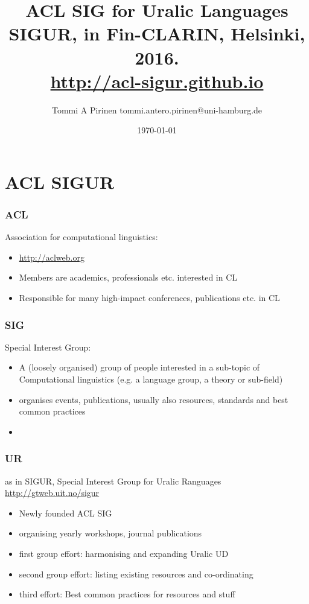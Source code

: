 \documentclass{beamer}
\title{ACL SIG for Uralic Languages SIGUR,
\scriptsize{in Fin-CLARIN, Helsinki, 2016.\\
\url{http://acl-sigur.github.io}}}
\author{Tommi A Pirinen \scriptsize \guilsinglleft
tommi.antero.pirinen@uni-hamburg.de \guilsinglright }
\institute{Universität Hamburg}
\date{\today}
\begin{document}

\maketitle

\section{ACL SIGUR}

\begin{frame}
    \frametitle{ACL}
    Association for computational linguistics:
    \begin{itemize}
        \item \url{http://aclweb.org}
        \item Members are academics, professionals etc. interested in CL
        \item Responsible for many high-impact conferences, publications
            etc. in CL
    \end{itemize}
\end{frame}

\begin{frame}
    \frametitle{SIG}
    Special Interest Group:
    \begin{itemize}
        \item A (loosely organised) group of people interested in a
            sub-topic of Computational linguistics (e.g. a language
            group, a theory or sub-field)
        \item organises events, publications, usually also resources,
            standards and best common practices
        \item
    \end{itemize}
\end{frame}

\begin{frame}
    \frametitle{UR}
    as in SIGUR, Special Interest Group for Uralic Ranguages
    \url{http://gtweb.uit.no/sigur}
    \begin{itemize}
        \item Newly founded ACL SIG
        \item organising yearly workshops, journal publications
        \item first group effort: harmonising and expanding Uralic UD
        \item second group effort: listing existing resources and co-ordinating
        \item third effort: Best common practices for resources and stuff
    \end{itemize}
\end{frame}
\end{document}
